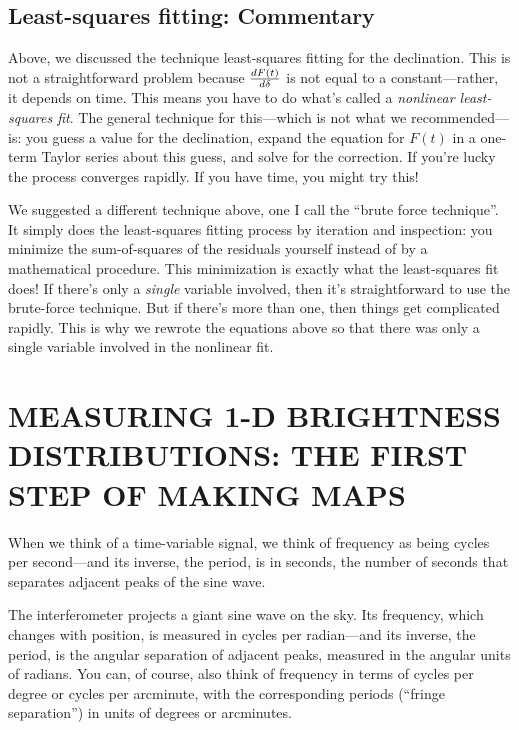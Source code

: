 \documentclass[11pt,preprint]{aastex}
\begin{document}
\subsection {Least-squares fitting: Commentary} 

	Above, we discussed the technique least-squares fitting for the
declination.  This is not a straightforward problem because ${dF(t)
\over d\delta}$ is not equal to a constant---rather, it depends on time.
 This means you have to do what's called a {\it nonlinear least-squares
fit}.  The general technique for this---which is not what we
recommended---is: you guess a value for the declination, expand the
equation for $F(t)$ in a one-term Taylor series about this guess, and
solve for the correction.  If you're lucky the process converges
rapidly.  If you have time, you might try this!

	We suggested a different technique above, one I call the ``brute
force technique''.  It simply does the least-squares fitting process by
iteration and inspection: you minimize the sum-of-squares of the
residuals yourself instead of by a mathematical procedure.  This
minimization is exactly what the least-squares fit does! If there's only
a {\it single} variable involved, then it's straightforward to use the
brute-force technique.  But if there's more than one, then things get
complicated rapidly.  This is why we rewrote the equations above so that
there was only a single variable involved in the nonlinear fit. 

\section{MEASURING 1-D BRIGHTNESS DISTRIBUTIONS: THE FIRST STEP OF
MAKING MAPS} \label{mun}

	When we think of a time-variable signal, we think of frequency
as being cycles per second---and its inverse, the period, is in seconds,
the number of seconds that separates adjacent peaks of the sine wave. 

	The interferometer projects a giant sine wave on the sky. Its
frequency, which changes with position, is measured in cycles per
radian---and its inverse, the period, is the angular separation of
adjacent peaks, measured in the angular units of radians. You can, of
course, also think of frequency in terms of cycles per degree or cycles
per arcminute, with the corresponding periods (``fringe separation'') in
units of degrees or arcminutes. 
\end{document}
